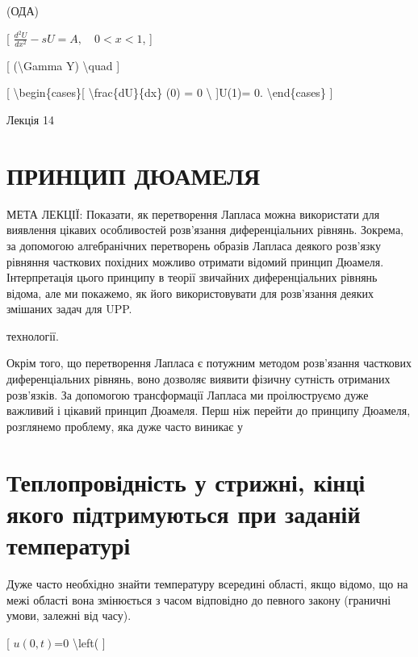 \documentclass[
]{article}
\begin{document}
{{(ОДА)

{[} \(\frac{d^2U}{dx^2} - sU = A, \quad 0 < x < 1\), {]}

{[} (\textbackslash Gamma Y) \textbackslash quad {]}

{[} \textbackslash begin\{cases\}{[} \textbackslash frac\{dU\}\{dx\} (0)
= 0 \textbackslash{} {]}U(1)= 0. \textbackslash end\{cases\} {]}

Лекція 14

\section{ПРИНЦИП
ДЮАМЕЛЯ}\label{ux43fux440ux438ux43dux446ux438ux43f-ux434ux44eux430ux43cux435ux43bux44f}

МЕТА ЛЕКЦІЇ: Показати, як перетворення Лапласа можна використати для
виявлення цікавих особливостей розв'язання диференціальних рівнянь.
Зокрема, за допомогою алгебранічних перетворень образів Лапласа деякого
розв'язку рівняння часткових похідних можливо отримати відомий принцип
Дюамеля. Інтерпретація цього принципу в теорії звичайних диференціальних
рівнянь відома, але ми покажемо, як його використовувати для розв'язання
деяких змішаних задач для UPP.

технології.

Окрім того, що перетворення Лапласа є потужним методом розв'язання
часткових диференціальних рівнянь, воно дозволяє виявити фізичну
сутність отриманих розв'язків. За допомогою трансформації Лапласа ми
проілюструємо дуже важливий і цікавий принцип Дюамеля. Перш ніж перейти
до принципу Дюамеля, розглянемо проблему, яка дуже часто виникає у

\section{Теплопровідність у стрижні, кінці якого підтримуються при
заданій
температурі}\label{ux442ux435ux43fux43bux43eux43fux440ux43eux432ux456ux434ux43dux456ux441ux442ux44c-ux443-ux441ux442ux440ux438ux436ux43dux456-ux43aux456ux43dux446ux456-ux44fux43aux43eux433ux43e-ux43fux456ux434ux442ux440ux438ux43cux443ux44eux442ux44cux441ux44f-ux43fux440ux438-ux437ux430ux434ux430ux43dux456ux439-ux442ux435ux43cux43fux435ux440ux430ux442ux443ux440ux456}

Дуже часто необхідно знайти температуру всередині області, якщо відомо,
що на межі області вона змінюється з часом відповідно до певного закону
(граничні умови, залежні від часу).

{[} \(u(0,t)\)=0 \textbackslash left( {]}

}}
\end{document}
